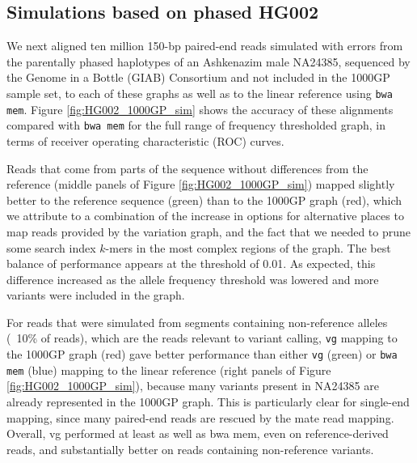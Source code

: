 \subsection{Simulations based on phased HG002}
\label{sec:1000GP_sim}

We next aligned ten million 150-bp paired-end reads simulated with errors from the parentally phased haplotypes of an Ashkenazim male NA24385, sequenced by the Genome in a Bottle (GIAB) Consortium \cite{zook2016extensive} and not included in the 1000GP sample set, to each of these graphs as well as to the linear reference using {\tt bwa mem}.
Figure \ref{fig:HG002_1000GP_sim} shows the accuracy of these alignments compared with {\tt bwa mem} for the full range of frequency thresholded graph, in terms of receiver operating characteristic (ROC) curves.

Reads that come from parts of the sequence without differences from the reference (middle panels of Figure \ref{fig:HG002_1000GP_sim}) mapped slightly better to the reference sequence (green) than to the 1000GP graph (red), which we attribute to a combination of the increase in options for alternative places to map reads provided by the variation graph, and the fact that we needed to prune some search index $k$-mers in the most complex regions of the graph.
The best balance of performance appears at the threshold of 0.01.
As expected, this difference increased as the allele frequency threshold was lowered and more variants were included in the graph.

For reads that were simulated from segments containing non-reference alleles (~10\% of reads), which are the reads relevant to variant calling, {\tt vg} mapping to the 1000GP graph (red) gave better performance than either {\tt vg} (green) or {\tt bwa mem} (blue) mapping to the linear reference (right panels of Figure \ref{fig:HG002_1000GP_sim}), because many variants present in NA24385 are already represented in the 1000GP graph.
This is particularly clear for single-end mapping, since many paired-end reads are rescued by the mate read mapping.
Overall, vg performed at least as well as bwa mem, even on reference-derived reads, and substantially better on reads containing non-reference variants.

